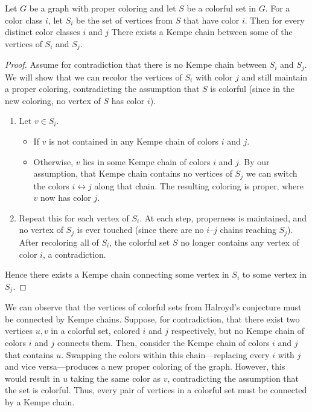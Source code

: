 \begin{claim}
    \label{colorful_kempe}
    Let $G$ be a graph with proper coloring and let $S$ be a colorful set in $G$. For a color class $i$, let 
    $S_i$ be the set of vertices from $S$ that have color $i$. Then for every distinct color classes $i$ and $j$
    There exists a Kempe chain between some of the vertices of $S_i$ and $S_j$.
\end{claim}
\begin{proof}
    Assume for contradiction that there is no Kempe chain between $S_i$ and $S_j$.  We will show that we can recolor the vertices of $S_i$ with color $j$ and still maintain a proper coloring, contradicting the assumption that $S$ is colorful (since in the new coloring, no vertex of $S$ has color $i$).
    
    \begin{enumerate}
      \item Let $v\in S_i$.
        \begin{itemize}
          \item If $v$ is not contained in any Kempe chain of colors $i$ and $j$.
          \item Otherwise, $v$ lies in some Kempe chain of colors $i$ and $j$.  By our assumption, that Kempe chain contains no vertices of $S_j$ we can switch the colors $i\leftrightarrow j$ along that chain. The resulting coloring is proper, where $v$ now has color $j$.
        \end{itemize}
      \item Repeat this for each vertex of $S_i$.  At each step, properness is maintained, and no vertex of $S_j$ is ever touched (since there are no $i$–$j$ chains reaching $S_j$).  After recoloring all of $S_i$, the colorful set $S$ no longer contains any vertex of color $i$, a contradiction.
    \end{enumerate}
    
    Hence there exists a Kempe chain connecting some vertex in $S_i$ to some vertex in $S_j$.
    \end{proof}
    
We can observe that the vertices of colorful sets from Halroyd's conjecture must be connected by Kempe chains.
Suppose, for contradiction, that there exist two vertices  $u, v$ in a colorful set, colored  $i$ and  $j$ respectively,
but no Kempe chain of colors  $i$ and  $j$ connects them.
Then, consider the Kempe chain of colors  $i$ and  $j$ that contains  $u$. Swapping the colors within this chain—replacing every  $i$ with  $j$ and vice versa—produces a new proper coloring of the graph.
However, this would result in  $u$ taking the same color as  $v$, contradicting the assumption that the set is colorful.
Thus, every pair of vertices in a colorful set must be connected by a Kempe chain.

